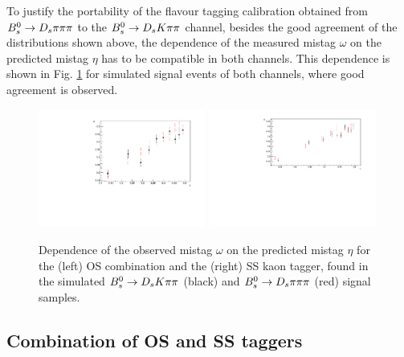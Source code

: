 To justify the portability of the flavour tagging calibration obtained from ${{B}^0_{s}}\rightarrow{\ensuremath{{D}_{s}}}{\ensuremath{\pi}}{\ensuremath{\pi}}{\ensuremath{\pi}}$ to the ${{B}^0_{s}}\rightarrow{\ensuremath{{D}_{s}}}{\ensuremath{K}}{\ensuremath{\pi}}{\ensuremath{\pi}}$ channel, 
besides the good agreement of the distributions shown above, the dependence of the measured mistag $\omega$ on the predicted mistag $\eta$ has to be compatible in both channels.
This dependence is shown in Fig. \ref{fig:etavsW_mc_comparison} for simulated signal events of both channels, where good agreement is observed. 

\begin{figure}[h]
\includegraphics[height=7.cm,width=0.49\textwidth]{figs/Tagging/OS_combination_MCcomparison.pdf}
\includegraphics[height=7.cm,width=0.49\textwidth]{figs/Tagging/SS_nnetKaon_MCcomparison.pdf}
\caption{Dependence of the observed mistag $\omega$ on the predicted mistag $\eta$ for the (left) OS combination and the (right) SS kaon tagger, 
found in the simulated ${{B}^0_{s}}\rightarrow{\ensuremath{{D}_{s}}}{\ensuremath{K}}{\ensuremath{\pi}}{\ensuremath{\pi}}$ (black) and ${{B}^0_{s}}\rightarrow{\ensuremath{{D}_{s}}}{\ensuremath{\pi}}{\ensuremath{\pi}}{\ensuremath{\pi}}$ (red) signal samples.}
\label{fig:etavsW_mc_comparison}
\end{figure}


\subsection{Combination of OS and SS taggers}
\label{subsec: TaggingCombination}

